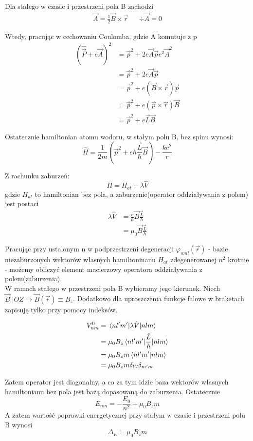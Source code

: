 \documentclass[a4paper,12pt]{article}
\begin{document}
Dla stałego w czasie i przestrzeni pola B zachodzi
\begin{align*}
\vec{A} = \frac{1}{2} \vec{B} \times \vec{r} && \div{\vec{A}} = 0
\end{align*}

Wtedy, pracując w cechowaniu Coulomba, gdzie A komutuje z p
\begin{align*}
(\hat{\vec{P}}+e\vec{A})^{2} &= \vec{p}^2 +2e\vec{A}\vec{p} e^2\vec{A}^2 \\
							 &= \vec{p}^2 +2e\vec{A}\vec{p} \\
							 &= \vec{p}^2 + e(\vec{B} \times \vec{r})\vec{p} \\
							 &= \vec{p}^2 + e(\vec{p} \times \vec{r})\vec{B} \\
							 &= \vec{p}^2 + e\vec{L}\vec{B}
\end{align*}

Ostatecznie hamiltonian atomu wodoru, w stałym polu B, bez spinu wynosi:
$$\hat{H} = \frac{1}{2m}(\vec{p}^2 + e\hbar \frac{\vec{L}}{\hbar} \vec{B}) - \frac{ke^2}{r}$$

Z rachunku zaburzeń:
$$H= H_{at} + \lambda\hat{V}$$
gdzie $H_{at}$ to hamiltonian bez pola, a zaburzenie(operator oddziaływania z polem) jest postaci
\begin{align*}
\lambda \hat{V} &= \frac{e}{\hbar} \vec{B} \frac{\vec{L}}{\hbar} \\
				&= \mu_0  \vec{B} \frac{\vec{L}}{\hbar}
\end{align*} 

Pracując przy ustalonym n w podprzestrzeni degeneracji $\varphi_{nml}(\vec{r})$ - bazie niezaburzonych wektorów własnych hamiltoninanu $H_{at}$ zdegenerowanej $n^2$ krotnie - możemy obliczyć element macierzowy operatora oddziaływania z polem(zaburzenia). \\
W ramach stałego w przestrzeni pola B wybieramy jego kierunek. Niech $\vec{B} || OZ \rightarrow \vec{B}(\vec{r}) \equiv B_z$. Dodatkowo dla uproszczenia funkcje falowe w braketach zapisuję tylko przy pomocy indeksów.

\begin{align*}
V^0_{nm} &= \matrixel{nl'm'}{\lambda \hat{V}}{nlm} \\
		 &= \mu_0 B_z \matrixel{nl'm'}{\frac{\hat{L}}{\hbar}}{nlm} \\
		 &= \mu_0 B_z m \braket{nl'm'}{nlm} \\
		 &= \mu_0 B_z m \delta_{l'l}\delta_{m'm}
\end{align*}

Zatem operator jest diagonalny, a co za tym idzie baza wektorów własnych hamiltonianu bez pola jest bazą dopasowaną do zaburzenia. Ostatecznie
$$E_{nm} =  -\frac{E_0}{n^2} + \mu_0 B_z m$$
A zatem wartość poprawki energetycznej przy stałym w czasie i przestrzeni polu B wynosi
$$\Delta_E = \mu_0 B_z m $$
\end{document}

